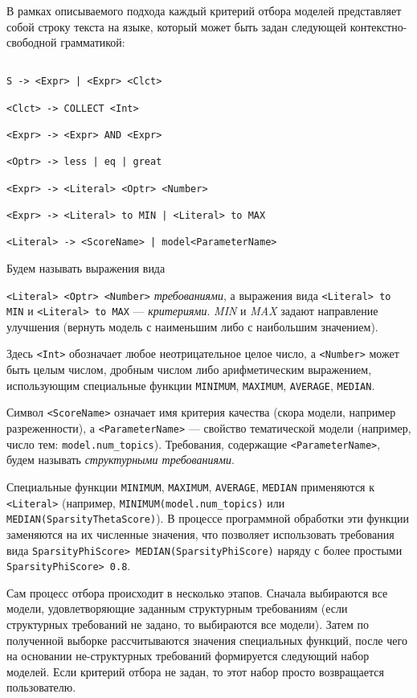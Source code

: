 В рамках описываемого подхода каждый критерий отбора моделей представляет собой строку текста на языке, который может быть задан следующей контекстно-свободной грамматикой: 

\begin{lstlisting}

S -> <Expr> | <Expr> <Clct>

<Clct> -> COLLECT <Int>

<Expr> -> <Expr> AND <Expr>

<Optr> -> less | eq | great

<Expr> -> <Literal> <Optr> <Number>

<Expr> -> <Literal> to MIN | <Literal> to MAX

<Literal> -> <ScoreName> | model<ParameterName>

\end{lstlisting} 

Будем называть выражения вида

\lstinline{<Literal> <Optr> <Number>} \textit{требованиями}, а выражения вида \lstinline{<Literal> to MIN} и \lstinline{<Literal> to MAX} --- \textit{критериями}. \textit{MIN} и \textit{MAX} задают направление улучшения (вернуть модель с наименьшим либо с наибольшим значением).  

Здесь \lstinline{<Int>} обозначает любое неотрицательное целое число, а \lstinline{<Number>} может быть целым числом, дробным числом либо арифметическим выражением, использующим специальные функции \texttt{MINIMUM}, \texttt{MAXIMUM}, \texttt{AVERAGE}, \texttt{MEDIAN}.  

Символ \lstinline{<ScoreName>} означает имя критерия качества (скора модели, например разреженности), а \lstinline{<ParameterName>} --- свойство тематической модели (например, число тем: \texttt{model.num\_topics}). Требования, содержащие \lstinline{<ParameterName>}, будем называть \textit{структурными требованиями}.  

Специальные функции \texttt{MINIMUM}, \texttt{MAXIMUM}, \texttt{AVERAGE}, \texttt{MEDIAN} применяются к \lstinline{<Literal>} (например, \texttt{MINIMUM(model.num\_topics)} или \texttt{MEDIAN(SparsityThetaScore)}). В процессе программной обработки эти функции заменяются на их численные значения, что позволяет использовать требования вида \texttt{SparsityPhiScore\@word > MEDIAN(SparsityPhiScore\@word)} наряду с более простыми \texttt{SparsityPhiScore\@word > 0.8}.  

Сам процесс отбора происходит в несколько этапов. Сначала выбираются все модели, удовлетворяющие заданным структурным требованиям (если структурных требований не задано, то выбираются все модели). Затем по полученной выборке рассчитываются значения специальных функций, после чего на основании не-структурных требований формируется следующий набор моделей. Если критерий отбора не задан, то этот набор просто возвращается пользователю.  

